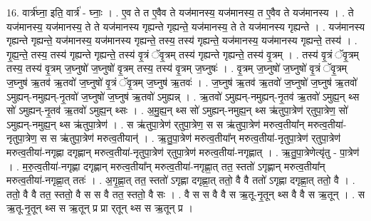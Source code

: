 \documentclass[17pt]{extarticle}
\begin{document}
16. वार्त्र॑घ्ना॒ इति॒ वार्त्र॑ - घ्नाः॒ । . ए॒व ते त ए॒वैव ते यज॑मानस्य॒ यज॑मानस्य॒ त ए॒वैव ते यज॑मानस्य । . ते यज॑मानस्य॒ यज॑मानस्य॒ ते ते यज॑मानस्य गृह्यन्ते गृह्यन्ते॒ यज॑मानस्य॒ ते ते यज॑मानस्य गृह्यन्ते । . यज॑मानस्य गृह्यन्ते गृह्यन्ते॒ यज॑मानस्य॒ यज॑मानस्य गृह्यन्ते॒ तस्य॒ तस्य॑ गृह्यन्ते॒ यज॑मानस्य॒ यज॑मानस्य गृह्यन्ते॒ तस्य॑ । . गृ॒ह्य॒न्ते॒ तस्य॒ तस्य॑ गृह्यन्ते गृह्यन्ते॒ तस्य॑ वृ॒त्रं ॅवृ॒त्रम् तस्य॑ गृह्यन्ते गृह्यन्ते॒ तस्य॑ वृ॒त्रम् । . तस्य॑ वृ॒त्रं ॅवृ॒त्रम् तस्य॒ तस्य॑ वृ॒त्रम् ज॒घ्नुषो॑ ज॒घ्नुषो॑ वृ॒त्रम् तस्य॒ तस्य॑ वृ॒त्रम् ज॒घ्नुषः॑ । . वृ॒त्रम् ज॒घ्नुषो॑ ज॒घ्नुषो॑ वृ॒त्रं ॅवृ॒त्रम् ज॒घ्नुष॑ ऋ॒तव॑ ऋ॒तवो॑ ज॒घ्नुषो॑ वृ॒त्रं ॅवृ॒त्रम् ज॒घ्नुष॑ ऋ॒तवः॑ । . ज॒घ्नुष॑ ऋ॒तव॑ ऋ॒तवो॑ ज॒घ्नुषो॑ ज॒घ्नुष॑ ऋ॒तवो॑ ऽमुह्यन्-नमुह्यन्-नृ॒तवो॑ ज॒घ्नुषो॑ ज॒घ्नुष॑ ऋ॒तवो॑ ऽमुह्यन्न् । . ऋ॒तवो॑ ऽमुह्यन्-नमुह्यन्-नृ॒तव॑ ऋ॒तवो॑ ऽमुह्य॒न् थ्स सो॑ ऽमुह्यन्-नृ॒तव॑ ऋ॒तवो॑ ऽमुह्य॒न् थ्सः । . अ॒मु॒ह्य॒न् थ्स सो॑ ऽमुह्यन्-नमुह्य॒न् थ्स ऋ॑तुपा॒त्रेण॑ र्‌तुपा॒त्रेण॒ सो॑ ऽमुह्यन्-नमुह्य॒न् थ्स ऋ॑तुपा॒त्रेण॑ । . स ऋ॑तुपा॒त्रेण॑ र्‌तुपा॒त्रेण॒ स स ऋ॑तुपा॒त्रेण॑ मरुत्व॒तीया᳚न् मरुत्व॒तीया॑-नृतुपा॒त्रेण॒ स स ऋ॑तुपा॒त्रेण॑ मरुत्व॒तीयान्॑ । . ऋ॒तु॒पा॒त्रेण॑ मरुत्व॒तीया᳚न् मरुत्व॒तीया॑-नृतुपा॒त्रेण॑ र्‌तुपा॒त्रेण॑ मरुत्व॒तीया॑-नगृह्णा दगृह्णान् मरुत्व॒तीया॑-नृतुपा॒त्रेण॑ र्‌तुपा॒त्रेण॑ मरुत्व॒तीया॑-नगृह्णात् । . ऋ॒तु॒पा॒त्रेणेत्यृ॑तु - पा॒त्रेण॑ । . म॒रु॒त्व॒तीया॑-नगृह्णा दगृह्णान् मरुत्व॒तीया᳚न् मरुत्व॒तीया॑-नगृह्णा॒त् तत॒ स्ततो॑ ऽगृह्णान् मरुत्व॒तीया᳚न् मरुत्व॒तीया॑-नगृह्णा॒त् ततः॑ । . अ॒गृ॒ह्णा॒त् तत॒ स्ततो॑ ऽगृह्णा दगृह्णा॒त् ततो॒ वै वै ततो॑ ऽगृह्णा दगृह्णा॒त् ततो॒ वै । . ततो॒ वै वै तत॒ स्ततो॒ वै स स वै तत॒ स्ततो॒ वै सः । . वै स स वै वै स ऋ॒तू-नृ॒तून् थ्स वै वै स ऋ॒तून् । . स ऋ॒तू-नृ॒तून् थ्स स ऋ॒तून् प्र प्रा र्‌तून् थ्स स ऋ॒तून् प्र । \newline
\end{document}
